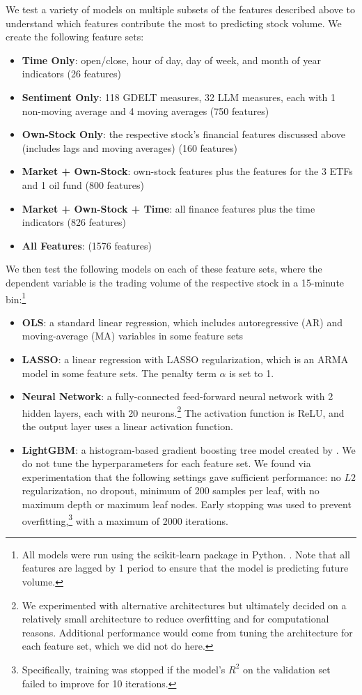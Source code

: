 \documentclass[12pt]{article}
\begin{document}
We test a variety of models on multiple subsets of the features described above to understand which features contribute the most to predicting stock volume. We create the following feature sets:
\begin{itemize}
\singlespacing
    \item \textbf{Time Only}: open/close, hour of day, day of week, and month of year indicators (26 features)
    \item \textbf{Sentiment Only}: 118 GDELT measures, 32 LLM measures, each with 1 non-moving average and 4 moving averages (750 features)
    \item \textbf{Own-Stock Only}: the respective stock's financial features discussed above (includes lags and moving averages) (160 features)
    \item \textbf{Market + Own-Stock}: own-stock features plus the features for the 3 ETFs and 1 oil fund (800 features)
    \item \textbf{Market + Own-Stock + Time}: all finance features plus the time indicators (826 features)
    \item \textbf{All Features}: (1576 features)
\end{itemize}
We then test the following models on each of these feature sets, where the dependent variable is the trading volume of the respective stock in a 15-minute bin:\footnote{All models were run using the \textsf{scikit-learn} package in Python. \textcite{scikit-learn}. Note that all features are lagged by 1 period to ensure that the model is predicting future volume.}
\begin{itemize}
\singlespacing
    \item \textbf{OLS}: a standard linear regression, which includes autoregressive (AR) and moving-average (MA) variables in some feature sets
    \item \textbf{LASSO}: a linear regression with LASSO regularization, which is an ARMA model in some feature sets. The penalty term $\alpha$ is set to 1.
    \item \textbf{Neural Network}: a fully-connected feed-forward neural network with 2 hidden layers, each with 20 neurons.\footnote{We experimented with alternative architectures but ultimately decided on a relatively small architecture to reduce overfitting and for computational reasons. Additional performance would come from tuning the architecture for each feature set, which we did not do here.} The activation function is ReLU, and the output layer uses a linear activation function.
    \item \textbf{LightGBM}: a histogram-based gradient boosting tree model created by \textcite{ke2017lightgbm}. We do not tune the hyperparameters for each feature set. We found via experimentation that the following settings gave sufficient performance: no $L2$ regularization, no dropout, minimum of 200 samples per leaf, with no maximum depth or maximum leaf nodes. Early stopping was used to prevent overfitting,\footnote{Specifically, training was stopped if the model's $R^2$ on the validation set failed to improve for 10 iterations.} with a maximum of 2000 iterations.
\end{itemize}
\end{document}
